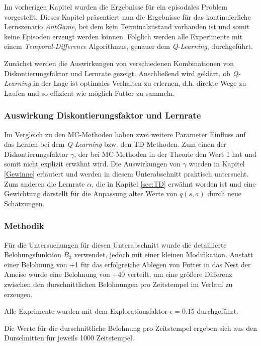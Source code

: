 Im vorherigen Kapitel wurden die Ergebnisse für ein episodales Problem vorgestellt. Dieses Kapitel präsentiert nun die Ergebnisse für das kontinuierliche Lernszenario \textit{AntGame}, bei dem kein Terminalzustand vorhanden ist und somit keine Episoden erzeugt werden können. Folglich werden alle Experimente mit einem \textit{Temporal-Difference} Algorithmus, genauer dem \textit{Q-Learning}, durchgeführt. 
\par 
Zunächst werden die Auswirkungen von verschiedenen Kombinationen von Diskontierungsfaktor und Lernrate gezeigt. Anschließend wird geklärt, ob \textit{Q-Learning} in der Lage ist optimales Verhalten zu erlernen, d.h. direkte Wege zu Laufen und so effizient wie möglich Futter zu sammeln.


\subsubsection{Auswirkung Diskontierungsfaktor und Lernrate}
Im Vergleich zu den MC-Methoden haben zwei weitere Parameter Einfluss auf das Lernen bei dem \textit{Q-Learning} bzw. den TD-Methoden. Zum einen der Diskontierungsfaktor $\gamma$, der bei MC-Methoden in der Theorie den Wert 1 hat und somit nicht explizit erwähnt wird. Die Auswirkungen von $\gamma$ wurden in Kapitel \ref{Gewinne} erläutert und werden in diesem Unterabschnitt praktisch untersucht. Zum anderen die Lernrate $\alpha$, die in Kapitel \ref{sec:TD} erwähnt worden ist und eine Gewichtung darstellt für die Anpassung alter Werte von $q(s,a)$ durch neue Schätzungen.

\subsubsection*{Methodik}
Für die Untersuchungen für diesen Unterabschnitt wurde die detaillierte Belohungsfunktion $B_3$ verwendet, jedoch mit einer kleinen Modifikation. Anstatt einer Belohnung von +1 für das erfolgreiche Ablegen von Futter in das Nest der Ameise wurde eine Belohnung von +40 verteilt, um eine größere Differenz zwischen den durschnittlichen Belohnungen pro Zeitstempel im Verlauf zu erzeugen.
\par 
Alle Exprimente wurden mit dem Explorationsfaktor $\epsilon = 0.15$ durchgeführt.
\par 
Die Werte für die durschnittliche Belohnung pro Zeitstempel ergeben sich aus den Durschnitten für jeweils 1000 Zeitstempel.

